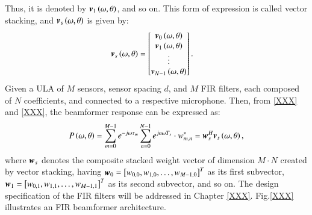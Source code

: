 Thus, it is denoted by $\boldsymbol{v}_{1}\left({\omega,\theta}\right)$, and so on.
This form of expression is called vector stacking, and $\boldsymbol{v}_{s}\left({\omega,\theta}\right)$ is given by:
\begin{align}
\boldsymbol{v}_{s}\left({\omega,\theta}\right) &= 
\begin{bmatrix}
   \boldsymbol{v}_{0}\left({\omega,\theta}\right) \\
   \boldsymbol{v}_{1}\left({\omega,\theta}\right) \\
   \vdots \\
   \boldsymbol{v}_{N-1}\left({\omega,\theta}\right)
\end{bmatrix}.
\end{align}
Given a ULA of $M$ sensors, sensor spacing $d$, and $M$ FIR filters, each composed of $N$ coefficients, and connected to a respective microphone. 
Then, from \eqref{XXX} and
\eqref{XXX}, the beamformer response can be expressed as:
\begin{equation}
    P\left({\omega,\theta}\right)=    \sum_{m=0}^{M-1}e^{-j\omega\tau_{m}}\sum_{n=0}^{N-1}e^{jn\omega{}T_{s}}\cdot{}w_{m,n}^{*}=\boldsymbol{w}_{s}^{H}\boldsymbol{v}_{s}\left({\omega,\theta}\right),
\end{equation}
where $\boldsymbol{w}_{s}$ denotes the composite stacked weight vector of dimension $M\cdot{}N$ created by vector stacking, having $\boldsymbol{w}_{0}=\left[{w_{0,0},w_{1,0},\dots,w_{M-1,0}}\right]^{T}$ as its first subvector, $\boldsymbol{w}_{1}=\left[{w_{0,1},w_{1,1},\dots,w_{M-1,1}}\right]^{T}$ as its second subvector, and so on.
The design specification of the FIR filters will be addressed in Chapter \ref{XXX}. Fig.\ref{XXX} illustrates an FIR beamformer architecture.